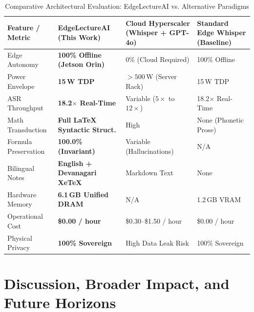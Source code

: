 \documentclass[11pt,a4paper,oneside]{report}
\begin{document}
\begin{table}[htbp]
\centering
\caption{Comparative Architectural Evaluation: EdgeLectureAI vs. Alternative Paradigms}
\label{tab:comparative_systems}
\begin{tabularx}{\textwidth}{lXXX}
\toprule
\textbf{Feature / Metric} & \textbf{EdgeLectureAI (This Work)} & \textbf{Cloud Hyperscaler (Whisper + GPT-4o)} & \textbf{Standard Edge Whisper (Baseline)} \\
\midrule
Edge Autonomy & \textbf{100\% Offline (Jetson Orin)} & 0\% (Cloud Required) & 100\% Offline \\
Power Envelope & \textbf{15\,W TDP} & $> 500$\,W (Server Rack) & 15\,W TDP \\
ASR Throughput & \textbf{18.2$\times$ Real-Time} & Variable ($5\times$ to $12\times$) & 18.2$\times$ Real-Time \\
Math Transduction & \textbf{Full LaTeX Syntactic Struct.} & High & None (Phonetic Prose) \\
Formula Preservation & \textbf{100.0\% (Invariant)} & Variable (Hallucinations) & N/A \\
Bilingual Notes & \textbf{English + Devanagari XeTeX} & Markdown Text & None \\
Hardware Memory & \textbf{6.1\,GB Unified DRAM} & N/A & 1.2\,GB VRAM \\
Operational Cost & \textbf{\$0.00 / hour} & \$0.30--\$1.50 / hour & \$0.00 / hour \\
Physical Privacy & \textbf{100\% Sovereign} & High Data Leak Risk & 100\% Sovereign \\
\bottomrule
\end{tabularx}
\end{table}

\chapter{Discussion, Broader Impact, and Future Horizons}
\label{chap:discussion}
\end{document}
